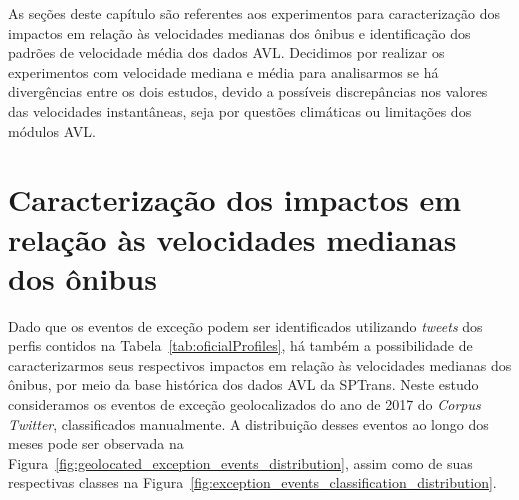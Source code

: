 \documentclass[
	12pt,				%
	oneside,			%
	a4paper,			%
	english,			%
	brazil				%
	]{abntex2ppgsi}
\begin{document}
{{As seções deste capítulo são referentes aos experimentos para caracterização dos impactos em relação às velocidades medianas dos ônibus e identificação dos padrões de velocidade média dos dados AVL. Decidimos por realizar os experimentos com velocidade mediana e média para analisarmos se há divergências entre os dois estudos, devido a possíveis discrepâncias nos valores das velocidades instantâneas, seja por questões climáticas ou limitações dos módulos AVL.

\section{Caracterização dos impactos em relação às velocidades medianas dos ônibus}
\label{dataCorr2}

Dado que os eventos de exceção podem ser identificados utilizando \textit{tweets} dos perfis contidos na Tabela~\ref{tab:oficialProfiles}, há também a possibilidade de caracterizarmos seus respectivos impactos em relação às velocidades medianas dos ônibus, por meio da base histórica dos dados AVL da SPTrans.  Neste estudo consideramos os eventos de exceção geolocalizados do ano de 2017 do \textit{Corpus Twitter}, classificados manualmente. A distribuição desses eventos ao longo dos meses pode ser observada  na Figura~\ref{fig:geolocated_exception_events_distribution}, assim como de suas respectivas classes na Figura~\ref{fig:exception_events_classification_distribution}.



}}
\end{document}
